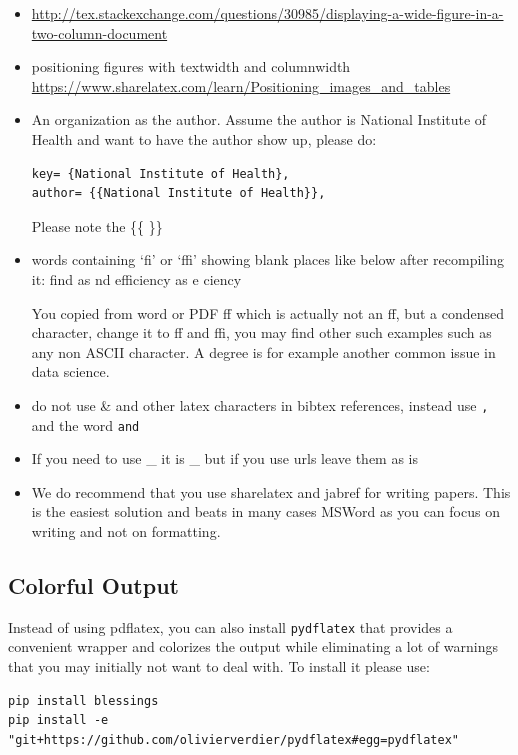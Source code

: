 \begin{itemize}
\item
  \url{http://tex.stackexchange.com/questions/30985/displaying-a-wide-figure-in-a-two-column-document}
\item
  positioning figures with textwidth and columnwidth
  \url{https://www.sharelatex.com/learn/Positioning_images_and_tables}
\item
  An organization as the author. Assume the author is National Institute
  of Health and want to have the author show up, please do:

\begin{verbatim}
key= {National Institute of Health},
author= {{National Institute of Health}},
\end{verbatim}

  Please note the \{\{ \}\}
\item
  words containing `fi' or `ffi' showing blank places like below after
  recompiling it: find as nd efficiency as e ciency

  You copied from word or PDF ff which is actually not an ff, but a
  condensed character, change it to ff and ffi, you may find other such
  examples such as any non ASCII character. A degree is for example
  another common issue in data science.
\item
  do not use \textbar{} \& and other latex characters in bibtex
  references, instead use \verb|,| and the word \verb|and|
\item
  If you need to use \_ it is \_ but if you use urls leave them as is
\item
  We do recommend that you use sharelatex and jabref for writing papers.
  This is the easiest solution and beats in many cases MSWord as you can
  focus on writing and not on formatting.
\end{itemize}

\subsection{Colorful Output}

Instead of using pdflatex, you can also install \verb|pydflatex| that
provides a convenient wrapper and colorizes the output while
eliminating a lot of warnings that you may initially not want to deal
with. To install it please use:

\begin{verbatim}
pip install blessings
pip install -e "git+https://github.com/olivierverdier/pydflatex#egg=pydflatex"
\end{verbatim}

